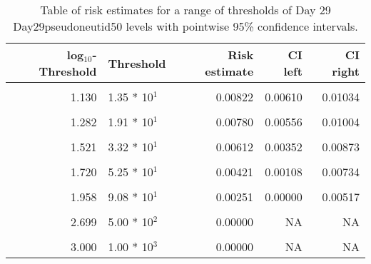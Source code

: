 \documentclass[]{article}
\begin{document}
\begin{table}[!h]

\caption{\label{tab:unnamed-chunk-14}Table of risk estimates for a range of thresholds of Day 29 Day29pseudoneutid50 levels with pointwise 95\% confidence intervals.}
\centering
\begin{tabular}[t]{rlrrr}
\toprule
log$_{10}$-Threshold & Threshold & Risk estimate & CI left & CI right\\
\midrule
\cellcolor{gray!6}{0.083} & \cellcolor{gray!6}{1.21 * 10$^{0}$} & \cellcolor{gray!6}{0.00855} & \cellcolor{gray!6}{0.00654} & \cellcolor{gray!6}{0.01056}\\
1.130 & 1.35 * 10$^{1}$ & 0.00822 & 0.00610 & 0.01034\\
\cellcolor{gray!6}{1.204} & \cellcolor{gray!6}{1.60 * 10$^{1}$} & \cellcolor{gray!6}{0.00816} & \cellcolor{gray!6}{0.00601} & \cellcolor{gray!6}{0.01031}\\
1.282 & 1.91 * 10$^{1}$ & 0.00780 & 0.00556 & 0.01004\\
\cellcolor{gray!6}{1.423} & \cellcolor{gray!6}{2.65 * 10$^{1}$} & \cellcolor{gray!6}{0.00655} & \cellcolor{gray!6}{0.00439} & \cellcolor{gray!6}{0.00872}\\
1.521 & 3.32 * 10$^{1}$ & 0.00612 & 0.00352 & 0.00873\\
\cellcolor{gray!6}{1.613} & \cellcolor{gray!6}{4.10 * 10$^{1}$} & \cellcolor{gray!6}{0.00547} & \cellcolor{gray!6}{0.00251} & \cellcolor{gray!6}{0.00844}\\
1.720 & 5.25 * 10$^{1}$ & 0.00421 & 0.00108 & 0.00734\\
\cellcolor{gray!6}{1.891} & \cellcolor{gray!6}{7.78 * 10$^{1}$} & \cellcolor{gray!6}{0.00359} & \cellcolor{gray!6}{0.00011} & \cellcolor{gray!6}{0.00708}\\
1.958 & 9.08 * 10$^{1}$ & 0.00251 & 0.00000 & 0.00517\\
\cellcolor{gray!6}{2.047} & \cellcolor{gray!6}{1.11 * 10$^{2}$} & \cellcolor{gray!6}{0.00194} & \cellcolor{gray!6}{0.00000} & \cellcolor{gray!6}{0.00402}\\
2.699 & 5.00 * 10$^{2}$ & 0.00000 & NA & NA\\
\cellcolor{gray!6}{2.828} & \cellcolor{gray!6}{6.73 * 10$^{2}$} & \cellcolor{gray!6}{0.00000} & \cellcolor{gray!6}{NA} & \cellcolor{gray!6}{NA}\\
3.000 & 1.00 * 10$^{3}$ & 0.00000 & NA & NA\\
\bottomrule
\end{tabular}
\end{table}
\end{document}

